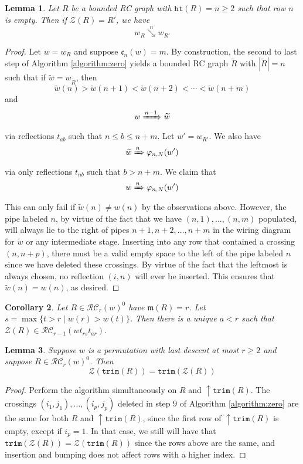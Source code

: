 \documentclass{amsart}
\newtheorem{lemma}{Lemma}[subsection]
\newtheorem{corollary}[lemma]{Corollary}
\theoremstyle{definition}
\theoremstyle{remark}
\numberwithin{equation}{subsection}
\newcommand{\shup}{{\uparrow}}
\newcommand{\downvar}[1]{\stackrel{#1}{\searrow}}
\newcommand{\wof}[1]{w_{#1}}
\newcommand{\Tom}[1]{\xRightarrow{#1}}
\newcommand{\trm}{\mathtt{trim}}
\newcommand{\zeromap}{\mathcal{Z}}
\newcommand{\hr}{\mathtt{ht}}
\newcommand{\RC}{\mathcal{RC}}
\newcommand{\code}{\mathfrak{c}}
\newcommand{\maxd}{\mathfrak{m}}
\begin{document}
\begin{lemma} \label{lemma:zerotransition}
Let $R$ be a bounded RC graph with $\hr(R)=n\geq 2$ such that row $n$ is empty. Then if $\zeromap(R) = R'$, we have
$$\wof{R}\downvar{n} \wof{R'}$$
\end{lemma}
\begin{proof}
Let $w=\wof{R}$ and suppose $\code_n(w) = m$. By construction, the second to last step of Algorithm \ref{algorithm:zero} yields a bounded RC graph $\widetilde{R}$ with $|\widetilde{R}|=n$ such that if $\widetilde{w} = \wof{\widetilde{R}}$, then
$$\widetilde{w}(n) > \widetilde{w}(n+1) < \widetilde{w}(n+2) < \cdots < \widetilde{w}(n + m)$$
and
$$w\Tom{n-1}\widetilde{w}$$
via reflections $t_{ab}$ such that $n\leq b\leq n+m$. Let $w' = \wof{R'}$. We also have
$$\widetilde{w}\Tom{n}\varphi_{n, N}(w')$$
via only reflections $t_{nb}$ such that $b>n+m$. We claim that
$$w\Tom{n} \varphi_{n, N}(w')$$
This can only fail if $\widetilde{w}(n)\neq w(n)$ by the observations above. However, the pipe labeled $n$, by virtue of the fact that we have $(n,1),\ldots,(n,m)$ populated, will always lie to the right of pipes $n+1,n+2,\ldots,n+m$ in the wiring diagram for $\widetilde{w}$ or any intermediate stage. Inserting into any row that contained a crossing $(n, n+p)$, there must be a valid empty space to the left of the pipe labeled $n$ since we have deleted these crossings. By virtue of the fact that the leftmost is always chosen, no reflection $(i,n)$ will ever be inserted. This ensures that $\widetilde{w}(n) = w(n)$, as desired.
\end{proof}

\begin{corollary} \label{corollary:zerotransition}
  Let $R\in\RC_r(w)^0$ have $\maxd(R)=r$. Let $s=\max\{t>r\mid w(r) > w(t)\}$. Then there is a unique $a<r$ such that $\zeromap(R)\in\RC_{r-1}(w t_{rs}t_{ar})$.
\end{corollary}


\begin{lemma} \label{lemma:ztrim}
Suppose $w$ is a permutation with last descent at most $r\geq 2$ and suppose $R\in\RC_r(w)^0$. Then
$$\zeromap(\trm(R))=\trm(\zeromap(R))$$
\end{lemma}
\begin{proof}
  Perform the algorithm simultaneously on $R$ and $\shup{}\trm(R)$. The crossings $(i_1,j_1),\ldots,(i_p,j_p)$ deleted in step $9$ of Algorithm \ref{algorithm:zero} are the same for both $R$ and $\shup{}\trm(R)$, since the first row of $\shup{}\trm(R)$ is empty, except if $i_p=1$. In that case, we still will have that $\trm(\zeromap(R)) = \zeromap(\trm(R))$ since the rows above are the same, and insertion and bumping does not affect rows with a higher index.
\end{proof}
\end{document}
